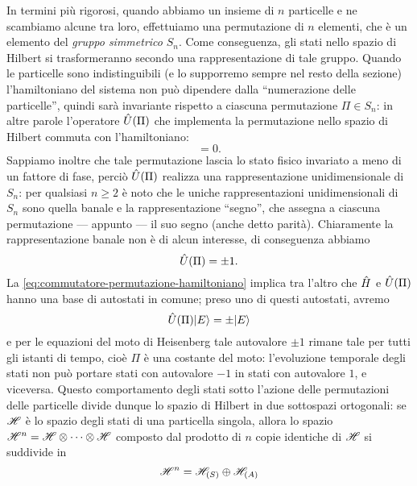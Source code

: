 In termini più rigorosi, quando abbiamo un insieme di $n$ particelle e ne scambiamo alcune tra loro, effettuiamo una permutazione di $n$ elementi, che è un elemento del \emph{gruppo simmetrico} $S_n$.
Come conseguenza, gli stati nello spazio di Hilbert si trasformeranno secondo una rappresentazione di tale gruppo.
Quando le particelle sono indistinguibili (e lo supporremo sempre nel resto della sezione) l'hamiltoniano del sistema non può dipendere dalla ``numerazione delle particelle'', quindi sarà invariante rispetto a ciascuna permutazione $\Pi\in S_n$: in altre parole l'operatore $\hat{U}(\Pi)$ che implementa la permutazione nello spazio di Hilbert commuta con l'hamiltoniano:
\begin{equation}
    [\op U(\Pi),\op H]=0.
    \label{eq:commutatore-permutazione-hamiltoniano}
\end{equation}
Sappiamo inoltre che tale permutazione lascia lo stato fisico invariato a meno di un fattore di fase, perciò $\hat{U}(\Pi)$ realizza una rappresentazione unidimensionale di $S_n$: per qualsiasi $n\ge 2$ è noto che le uniche rappresentazioni unidimensionali di $S_n$ sono quella banale e la rappresentazione ``segno'', che assegna a ciascuna permutazione --- appunto --- il suo segno (anche detto parità).
Chiaramente la rappresentazione banale non è di alcun interesse, di conseguenza abbiamo
\begin{equation}
    \hat{U}(\Pi)=\pm 1.
\end{equation}
La \eqref{eq:commutatore-permutazione-hamiltoniano} implica tra l'altro che $\hat{H}$ e $\hat{U}(\Pi)$ hanno una base di autostati in comune; preso uno di questi autostati, avremo
\begin{equation}
    \hat{U}(\Pi)\lvert E\rangle=\pm\lvert E\rangle
\end{equation}
e per le equazioni del moto di Heisenberg tale autovalore $\pm 1$ rimane tale per tutti gli istanti di tempo, cioè $\Pi$ è una costante del moto: l'evoluzione temporale degli stati non può portare stati con autovalore $-1$ in stati con autovalore $1$, e viceversa.
Questo comportamento degli stati sotto l'azione delle permutazioni delle particelle divide dunque lo spazio di Hilbert in due sottospazi ortogonali: se $\mathscr H$ è lo spazio degli stati di una particella singola, allora lo spazio $\mathscr H^n=\mathscr H\otimes\cdots\otimes\mathscr H$ composto dal prodotto di $n$ copie identiche di $\mathscr H$ si suddivide in
\begin{equation}
    \mathscr H^n=\mathscr H_{(S)}\oplus\mathscr H_{(A)}
\end{equation}
